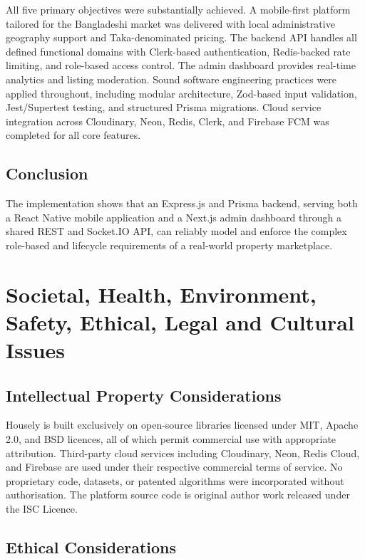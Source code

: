 \documentclass[12pt,a4paper]{report}
\begin{document}
All five primary objectives were substantially achieved. A mobile-first platform tailored
for the Bangladeshi market was delivered with local administrative geography support and
Taka-denominated pricing. The backend API handles all defined functional domains with
Clerk-based authentication, Redis-backed rate limiting, and role-based access control. The admin dashboard
provides real-time analytics and listing moderation. Sound software engineering practices
were applied throughout, including modular architecture, Zod-based input validation,
Jest/Supertest testing, and structured Prisma migrations. Cloud service integration across
Cloudinary, Neon, Redis, Clerk, and Firebase FCM was completed for all core features.

\section{Conclusion}

The implementation shows that an Express.js and Prisma backend, serving both a React
Native mobile application and a Next.js admin dashboard through a shared REST and
Socket.IO API, can reliably model and enforce the complex role-based and lifecycle
requirements of a real-world property marketplace.

\chapter{Societal, Health, Environment, Safety, Ethical, Legal and Cultural Issues}
\label{chap:societal}

\section{Intellectual Property Considerations}

Housely is built exclusively on open-source libraries licensed under MIT, Apache 2.0,
and BSD licences, all of which permit commercial use with appropriate attribution.
Third-party cloud services including Cloudinary, Neon, Redis Cloud, and Firebase are
used under their respective commercial terms of service. No proprietary code, datasets,
or patented algorithms were incorporated without authorisation. The platform source code
is original author work released under the ISC Licence.

\section{Ethical Considerations}
\end{document}
